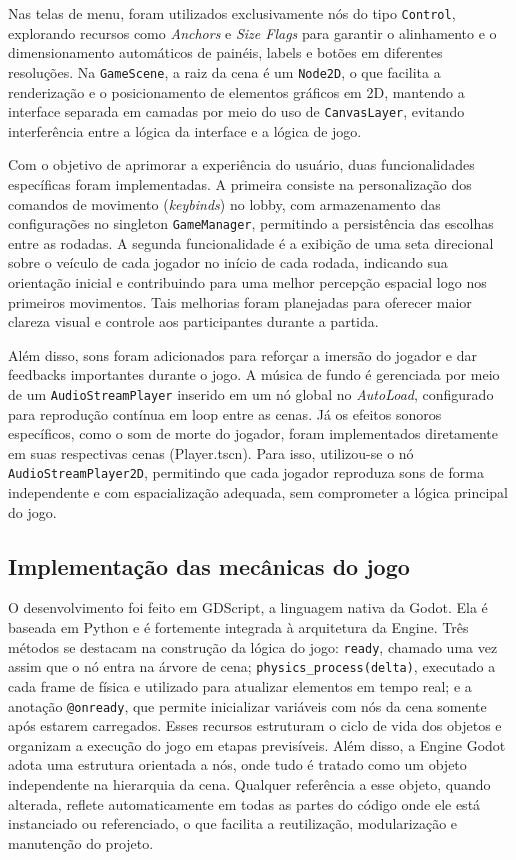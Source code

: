Nas telas de menu, foram utilizados exclusivamente nós do tipo \texttt{Control}, explorando recursos como \textit{Anchors} e \textit{Size Flags} para garantir o alinhamento e o dimensionamento automáticos de painéis, labels e botões em diferentes resoluções. Na \texttt{GameScene}, a raiz da cena é um \texttt{Node2D}, o que facilita a renderização e o posicionamento de elementos gráficos em 2D, mantendo a interface separada em camadas por meio do uso de \texttt{CanvasLayer}, evitando interferência entre a lógica da interface e a lógica de jogo.

Com o objetivo de aprimorar a experiência do usuário, duas funcionalidades específicas foram implementadas. A primeira consiste na personalização dos comandos de movimento (\textit{keybinds}) no lobby, com armazenamento das configurações no singleton \texttt{GameManager}, permitindo a persistência das escolhas entre as rodadas. A segunda funcionalidade é a exibição de uma seta direcional sobre o veículo de cada jogador no início de cada rodada, indicando sua orientação inicial e contribuindo para uma melhor percepção espacial logo nos primeiros movimentos. Tais melhorias foram planejadas para oferecer maior clareza visual e controle aos participantes durante a partida.

Além disso, sons foram adicionados para reforçar a imersão do jogador e dar feedbacks importantes durante o jogo. A música de fundo é gerenciada por meio de um \texttt{AudioStreamPlayer} inserido em um nó global no \textit{AutoLoad}, configurado para reprodução contínua em loop entre as cenas. Já os efeitos sonoros específicos, como o som de morte do jogador, foram implementados diretamente em suas respectivas cenas (Player.tscn). Para isso, utilizou-se o nó \texttt{AudioStreamPlayer2D}, permitindo que cada jogador reproduza sons de forma independente e com espacialização adequada, sem comprometer a lógica principal do jogo.

\subsection{Implementação das mecânicas do jogo}

O desenvolvimento foi feito em GDScript, a linguagem nativa da Godot. Ela é baseada em Python e é fortemente integrada à arquitetura da Engine. Três métodos se destacam na construção da lógica do jogo: \texttt{ready}, chamado uma vez assim que o nó entra na árvore de cena; \texttt{physics\_process(delta)}, executado a cada frame de física e utilizado para atualizar elementos em tempo real; e a anotação \texttt{@onready}, que permite inicializar variáveis com nós da cena somente após estarem carregados. Esses recursos estruturam o ciclo de vida dos objetos e organizam a execução do jogo em etapas previsíveis. Além disso, a Engine Godot adota uma estrutura orientada a nós, onde tudo é tratado como um objeto independente na hierarquia da cena. Qualquer referência a esse objeto, quando alterada, reflete automaticamente em todas as partes do código onde ele está instanciado ou referenciado, o que facilita a reutilização, modularização e manutenção do projeto.


